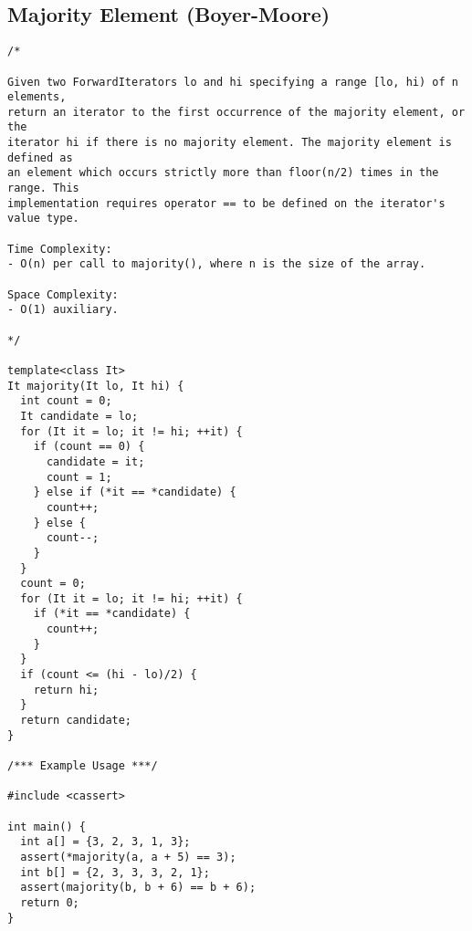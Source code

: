 \subsection{Majority Element (Boyer-Moore)}
\begin{lstlisting}
/*

Given two ForwardIterators lo and hi specifying a range [lo, hi) of n elements,
return an iterator to the first occurrence of the majority element, or the
iterator hi if there is no majority element. The majority element is defined as
an element which occurs strictly more than floor(n/2) times in the range. This
implementation requires operator == to be defined on the iterator's value type.

Time Complexity:
- O(n) per call to majority(), where n is the size of the array.

Space Complexity:
- O(1) auxiliary.

*/

template<class It>
It majority(It lo, It hi) {
  int count = 0;
  It candidate = lo;
  for (It it = lo; it != hi; ++it) {
    if (count == 0) {
      candidate = it;
      count = 1;
    } else if (*it == *candidate) {
      count++;
    } else {
      count--;
    }
  }
  count = 0;
  for (It it = lo; it != hi; ++it) {
    if (*it == *candidate) {
      count++;
    }
  }
  if (count <= (hi - lo)/2) {
    return hi;
  }
  return candidate;
}

/*** Example Usage ***/

#include <cassert>

int main() {
  int a[] = {3, 2, 3, 1, 3};
  assert(*majority(a, a + 5) == 3);
  int b[] = {2, 3, 3, 3, 2, 1};
  assert(majority(b, b + 6) == b + 6);
  return 0;
}
\end{lstlisting}
